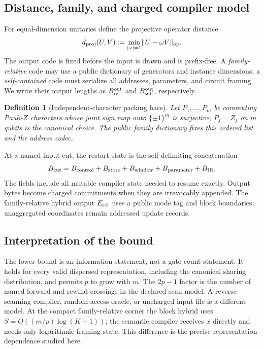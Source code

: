 \documentclass[aps,prx,reprint,floatfix,superscriptaddress]{revtex4-2}
\newtheorem{definition}{Definition}
\begin{document}
\subsection{Distance, family, and charged compiler model}

For equal-dimension unitaries define the projective operator distance
\begin{equation}
 d_{\rm proj}(U,V):=\min_{|\omega|=1}\lVert U-\omega V\rVert_{\rm op}.
 \label{eq:projective-distance}
\end{equation}
The output code is fixed before the input is drawn and is prefix-free.  A
\emph{family-relative} code may use a public dictionary of generators and
instance dimensions; a \emph{self-contained} code must serialize all
addresses, parameters, and circuit framing.  We write their output lengths
as $B_{\rm rel}^{\rm out}$ and $B_{\rm self}^{\rm out}$, respectively.

\begin{definition}[Independent-character packing base]
\label{def:packing-construction}
Let $P_1,\ldots,P_m$ be commuting Pauli-$Z$ characters whose joint sign map
onto $\{\pm1\}^m$ is surjective; $P_j=Z_j$ on $m$ qubits is the canonical
choice.  The public family dictionary fixes this ordered list and the
address codec.
\end{definition}

At a named input cut, the restart state is the self-delimiting concatenation
\begin{equation}
 B_{\rm cut}=B_{\rm control}+B_{\rm store}+B_{\rm window}
             +B_{\rm parameter}+B_{\rm IR}.
 \label{eq:info-budget}
\end{equation}
The fields include all mutable compiler state needed to resume exactly.
Output bytes become charged commitments when they are irrevocably appended.
The family-relative hybrid output $E_{\rm rel}$ uses a public mode tag and
block boundaries; unaggregated coordinates remain addressed update records.






\subsection{Interpretation of the bound}

The lower bound is an information statement, not a gate-count statement.
It holds for every valid dispersed representation, including the canonical
sharing distribution, and permits $p$ to grow with $m$.  The $2p-1$ factor is
the number of named forward and rewind crossings in the declared scan model.
A reverse-scanning compiler, random-access oracle, or uncharged input file is
a different model.  At the compact family-relative corner the block hybrid
uses $S=O((m/p)\log(K+1))$; the semantic compiler receives $x$ directly and
needs only logarithmic framing state.  This difference is the precise
representation dependence studied here.
\end{document}
